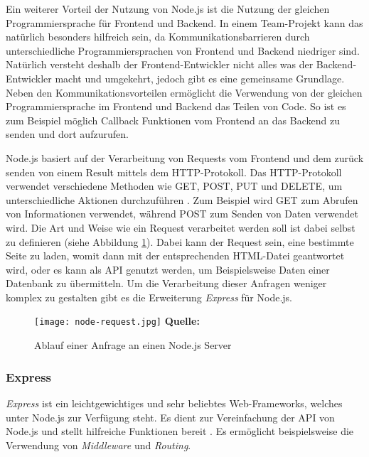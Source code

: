 Ein weiterer Vorteil der Nutzung von Node.js ist die Nutzung der gleichen Programmiersprache für Frontend und Backend.
In einem Team-Projekt kann das natürlich besonders hilfreich sein, da Kommunikationsbarrieren durch unterschiedliche Programmiersprachen von Frontend und Backend niedriger sind. Natürlich versteht deshalb der Frontend-Entwickler nicht alles was  der Backend-Entwickler macht und umgekehrt, jedoch gibt es eine gemeinsame Grundlage. Neben den Kommunikationsvorteilen ermöglicht die Verwendung von der gleichen Programmiersprache im Frontend und Backend das Teilen von Code. So ist es zum Beispiel möglich Callback Funktionen vom Frontend an das Backend zu senden und dort aufzurufen.

Node.js basiert auf der Verarbeitung von Requests vom Frontend und dem zurück senden von einem Result mittels dem HTTP-Protokoll. Das HTTP-Protokoll verwendet verschiedene Methoden wie GET, POST, PUT und DELETE, um unterschiedliche Aktionen durchzuführen  \cite{expressbook}. Zum Beispiel wird GET zum Abrufen von Informationen verwendet, während POST zum Senden von Daten verwendet wird. Die Art und Weise wie ein Request verarbeitet werden soll ist dabei selbst zu definieren (siehe Abbildung \ref{fig:node-request}). Dabei kann der Request sein, eine bestimmte Seite zu laden, womit dann mit der entsprechenden HTML-Datei geantwortet wird, oder es kann als API genutzt werden, um Beispielsweise Daten einer Datenbank zu übermitteln. Um die Verarbeitung dieser Anfragen weniger komplex zu gestalten gibt es die Erweiterung \textit{Express} für Node.js.

  

  \begin{figure}[ht]
  \centering
  \texttt{[image: node-request.jpg]}
\raggedleft
    \footnotesize\sffamily\textbf{Quelle:} \cite{expressbook}
  \caption{Ablauf einer Anfrage an einen Node.js Server}
  \label{fig:node-request}
\end{figure}


\subsubsection{Express}
\label{sec:express}
\textit{Express} ist ein leichtgewichtiges und sehr beliebtes Web-Frameworks, welches unter Node.js zur Verfügung steht. Es dient zur Vereinfachung der API von Node.js und stellt hilfreiche Funktionen bereit \cite{expressbook}. Es ermöglicht beispielsweise die Verwendung von \textit{Middleware} und \textit{Routing}.

